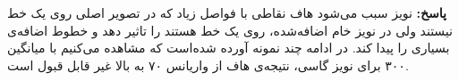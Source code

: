 \documentclass[12pt,a4paper]{article}
\theoremstyle{definition}
\theoremstyle{theorem}
\theoremstyle{definition}
\begin{document}
\textbf{پاسخ: }
نویز سبب می‌شود هاف نقاطی با فواصل زیاد که در تصویر اصلی روی یک خط نیستند ولی در نویز خام اضافه‌شده، روی یک خط هستند را تاثیر دهد و خطوط اضافه‌ی بسیاری را پیدا کند. در ادامه چند نمونه آورده شده‌است که مشاهده می‌کنیم با میانگین ۳۰۰ برای نویز گاسی، نتیجه‌ی هاف از واریانس ۷۰ به بالا غیر قابل قبول است.

\vspace{0.2cm}
\begin{center}
\end{center}
\end{document}
